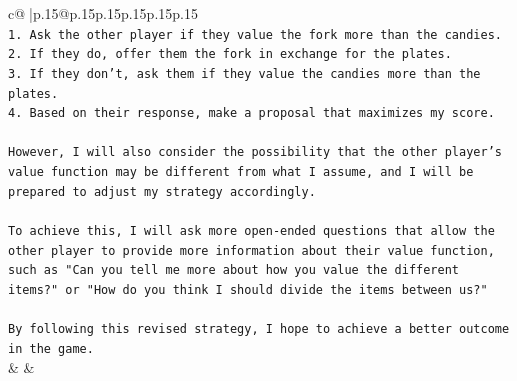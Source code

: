 \documentclass{article}
\begin{document}
{\begin{supertabular}{c@{$\;$}|p{.15\linewidth}@{}p{.15\linewidth}p{.15\linewidth}p{.15\linewidth}p{.15\linewidth}p{.15\linewidth}}
{{{\\ 
\texttt{1. Ask the other player if they value the fork more than the candies.} \\
\texttt{2. If they do, offer them the fork in exchange for the plates.} \\
\texttt{3. If they don't, ask them if they value the candies more than the plates.} \\
\texttt{4. Based on their response, make a proposal that maximizes my score.} \\
\\ 
\texttt{However, I will also consider the possibility that the other player's value function may be different from what I assume, and I will be prepared to adjust my strategy accordingly.} \\
\\ 
\texttt{To achieve this, I will ask more open{-}ended questions that allow the other player to provide more information about their value function, such as "Can you tell me more about how you value the different items?" or "How do you think I should divide the items between us?"} \\
\\ 
\texttt{By following this revised strategy, I hope to achieve a better outcome in the game.} \\
            }
        }
    }
    & & \\ \\


\end{supertabular}}
\end{document}
